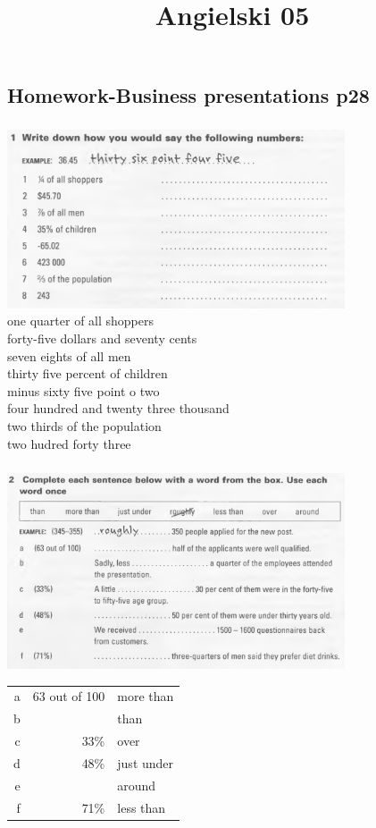 \documentclass[a4paper,12pt]{article}
\title{Angielski 05}
\author{}
\begin{document}
\maketitle

\begin{abstract}

\end{abstract}

\subsection{Homework-Business presentations p28}
\subsubsection{}
\includegraphics[width=10cm]{ang-2019-11-14-HW-01.png} \\
one quarter of all shoppers\\
forty-five dollars and seventy cents\\
seven eights of all men \\
thirty five percent of children \\
minus sixty five point o two \\
four hundred and twenty three thousand\\
two thirds of the population \\
two hudred forty three \\
\subsubsection{}
\includegraphics[width=10cm]{ang-2019-11-14-HW-02.png} \\
\begin{tabular}{r|rl}
a & 63 out of 100 & more than \\
b & & than \\
c & 33\% & over\\
d & 48\% & just under \\
e & & around \\
f & 71\% & less than \\
\end{tabular}
\end{document}
